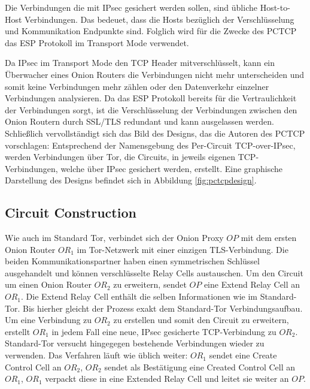 \documentclass[fleqn,envcountsame,runningheads,10pt,a4paper]{llncs}
\begin{document}
Die Verbindungen die mit IPsec gesichert werden sollen, sind übliche 
Host-to-Host Verbindungen. Das bedeuet, dass die Hosts bezüglich der 
Verschlüsselung und Kommunikation Endpunkte sind. Folglich wird für die Zwecke 
des PCTCP das ESP Protokoll im Transport Mode verwendet.

Da IPsec im Transport Mode den TCP Header mitverschlüsselt, kann ein Überwacher 
eines Onion Routers die Verbindungen nicht mehr unterscheiden und somit keine 
Verbindungen mehr zählen oder den Datenverkehr einzelner Verbindungen 
analysieren. Da das ESP Protokoll bereits für die Vertraulichkeit der 
Verbindungen sorgt, ist die Verschlüsselung der Verbindungen zwischen den Onion 
Routern durch SSL/TLS redundant und kann ausgelassen werden. Schließlich 
vervollständigt sich das Bild des Designs, das die Autoren des PCTCP 
vorschlagen: Entsprechend der Namensgebung des Per-Circuit TCP-over-IPsec, 
werden Verbindungen über Tor, die Circuits, in jeweils eigenen TCP-Verbindungen, 
welche über IPsec gesichert werden, erstellt. Eine graphische Darstellung des 
Designs befindet sich in Abbildung \ref{fig:pctcpdesign}.

\subsection{Circuit Construction}

Wie auch im Standard Tor, verbindet sich der Onion Proxy $\textit{OP}$ mit dem 
ersten Onion Router $\textit{OR}_1$ im Tor-Netzwerk mit einer einzigen 
TLS-Verbindung. Die beiden Kommunikationspartner haben einen symmetrischen 
Schlüssel ausgehandelt und können verschlüsselte Relay Cells austauschen. Um den 
Circuit um einen Onion Router $\textit{OR}_2$ zu erweitern, sendet $\textit{OP}$ 
eine Extend Relay Cell an $\textit{OR}_1$. Die Extend Relay Cell enthält die 
selben Informationen wie im Standard-Tor. Bis hierher gleicht der Prozess exakt 
dem Standard-Tor Verbindungsaufbau. Um eine Verbindung zu $\textit{OR}_2$ zu 
erstellen und somit den Circuit zu erweitern, erstellt $\textit{OR}_1$ in jedem 
Fall eine neue, IPsec gesicherte TCP-Verbindung zu $\textit{OR}_2$. Standard-Tor 
versucht hingegegen bestehende Verbindungen wieder zu verwenden. Das Verfahren 
läuft wie üblich weiter: $\textit{OR}_1$ sendet eine Create Control Cell an 
$\textit{OR}_2$, $\textit{OR}_2$ sendet als Bestätigung eine Created Control 
Cell an $\textit{OR}_1$, $\textit{OR}_1$ verpackt diese in eine Extended Relay 
Cell und leitet sie weiter an $\textit{OP}$.
\end{document}
